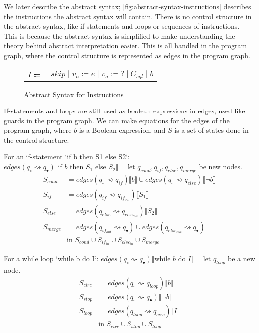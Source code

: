 We later describe the abstract syntax; \autoref{fig:abstract-syntax-instructions} describes the instructions the abstract syntax will contain.
There is no control structure in the abstract syntax, like if-statements and loops or sequences of instructions.
This is because the abstract syntax is simplified to make understanding the theory behind abstract interpretation easier.
This is all handled in the program graph, where the control structure is represented as edges in the program graph.

\begin{figure}
    \center
    \begin{tabular}{r l}
        $I \Coloneqq$ & $skip \mid v_a \coloneqq e \mid v_a \coloneqq ? \mid C_{sql} \mid b$
    \end{tabular}
    \caption{Abstract Syntax for Instructions}
    \label{fig:abstract-syntax-instructions}
\end{figure}

If-statements and loops are still used as boolean expressions in edges, used like guards in the program graph.
We can make equations for the edges of the program graph, where $b$ is a Boolean expression, and $S$ is a set of states done in the control structure.

For an if-statement `if b then S1 else S2`:
$edges(q_{\circ} \rightsquigarrow q_{\bullet})\llbracket \text{if } b \text{ then } S_1 \text{ else } S_2 \rrbracket = \text{let } q_{cond}, q_{if}, q_{else}, q_{merge}$ be new nodes.
\begin{align}
    S_{cond} &= edges(q_\circ \rightsquigarrow q_{if})\llbracket b \rrbracket \cup edges(q_\circ \rightsquigarrow q_{else})\llbracket \neg b \rrbracket \\
    S_{if} &= edges(q_{if} \rightsquigarrow q_{if_{out}})\llbracket S_1 \rrbracket \\
    S_{else} &= edges(q_{else} \rightsquigarrow q_{else_{out}})\llbracket S_2 \rrbracket \\
    S_{merge} &= edges(q_{if_{out}} \rightsquigarrow q_{\bullet}) \cup edges(q_{else_{out}} \rightsquigarrow q_{\bullet}) \\
    &\text{in } S_{cond} \cup S_{if_{in}} \cup S_{else_{in}} \cup S_{merge}
\end{align}

For a while loop `while b do I`:
$edges(q_{\circ} \rightsquigarrow q_{\bullet})\llbracket \text{while } b \text{ do } I \rrbracket = \text{let } q_{loop}$ be a new node.
\begin{align}
    S_{circ} &= edges(q_\circ \rightsquigarrow q_{loop}) \llbracket b \rrbracket \\
    S_{stop} &= edges(q_{\circ} \rightsquigarrow q_{\bullet})\llbracket \neg b \rrbracket \\
    S_{loop} &= edges(q_{loop} \rightsquigarrow q_{circ})\llbracket I \rrbracket \\
    &\text{in } S_{circ} \cup S_{stop} \cup S_{loop}
\end{align}


